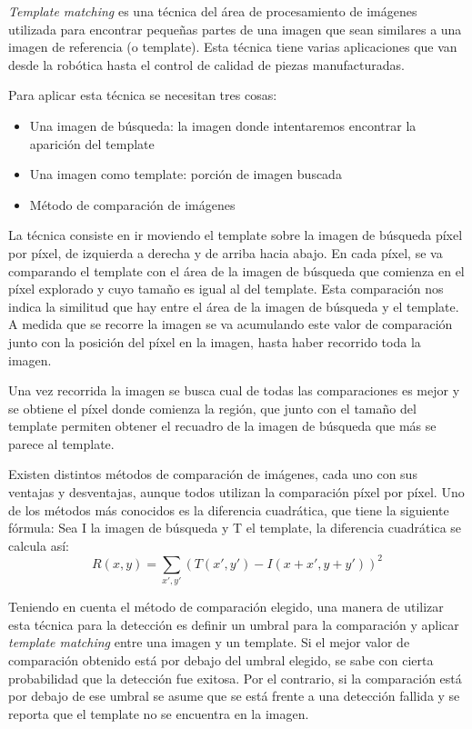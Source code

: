 \textit{Template matching} es una técnica del área de procesamiento de imágenes utilizada para encontrar pequeñas partes de una imagen que sean similares a una imagen de referencia (o template). Esta técnica tiene varias aplicaciones que van desde la robótica hasta el control de calidad de piezas manufacturadas.

Para aplicar esta técnica se necesitan tres cosas:
\begin{itemize}
	\item Una imagen de búsqueda: la imagen donde intentaremos encontrar la aparición del template
	\item Una imagen como template: porción de imagen buscada
	\item Método de comparación de imágenes
\end{itemize}

La técnica consiste en ir moviendo el template sobre la imagen de búsqueda píxel por píxel, de izquierda a derecha y de arriba hacia abajo. En cada píxel, se va comparando el template con el área de la imagen de búsqueda que comienza en el píxel explorado y cuyo tamaño es igual al del template. Esta comparación nos indica la similitud que hay entre el área de la imagen de búsqueda y el template. A medida que se recorre la imagen se va acumulando este valor de comparación junto con la posición del píxel en la imagen, hasta haber recorrido toda la imagen.

Una vez recorrida la imagen se busca cual de todas las comparaciones es mejor y se obtiene el píxel donde comienza la región, que junto con el tamaño del template permiten obtener el recuadro de la imagen de búsqueda que más se parece al template.

Existen distintos métodos de comparación de imágenes, cada uno con sus ventajas y desventajas, aunque todos utilizan la comparación píxel por píxel. Uno de los métodos más conocidos es la diferencia cuadrática, que tiene la siguiente fórmula: Sea I la imagen de búsqueda y T el template, la diferencia cuadrática se calcula así:
\begin{equation}\label{eq:diferencia_cuadratica}
R(x, y) = \displaystyle\sum\limits_{x', y'} (T(x', y') - I(x + x', y + y'))^2
\end{equation}

Teniendo en cuenta el método de comparación elegido, una manera de utilizar esta técnica para la detección es definir un umbral para la comparación y aplicar \textit{template matching} entre una imagen y un template. Si el mejor valor de comparación obtenido está por debajo del umbral elegido, se sabe con cierta probabilidad que la detección fue exitosa. Por el contrario, si la comparación está por debajo de ese umbral se asume que se está frente a una detección fallida y se reporta que el template no se encuentra en la imagen.


